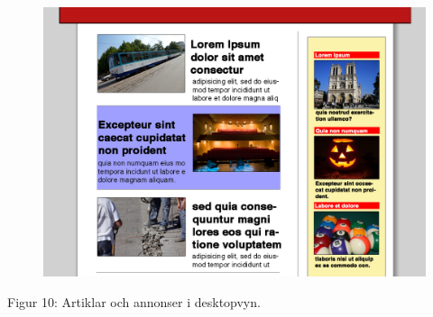 \documentclass[11pt]{article}
\begin{document}
\begin{figure}[H]
\centerline{%
\includegraphics[scale=0.3]{pics/artikelannonsdesktop.png}
}
\end{figure}
\hspace{0.5cm}Figur 10: Artiklar och annonser i desktopvyn.
\\
\end{document}

